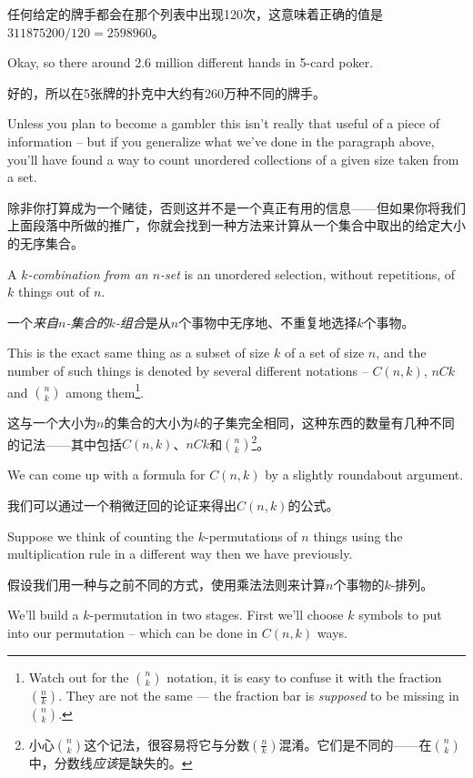 任何给定的牌手都会在那个列表中出现120次，这意味着正确的值是$311875200/120 = 2598960$。

Okay, so there around 2.6 million
different hands in 5-card poker.

好的，所以在5张牌的扑克中大约有260万种不同的牌手。

Unless you plan to become a gambler
this isn't really that useful of a piece of information -- but if you
generalize what we've done in the paragraph above, you'll have found
a way to count unordered collections of a given size taken from a set.

除非你打算成为一个赌徒，否则这并不是一个真正有用的信息——但如果你将我们上面段落中所做的推广，你就会找到一种方法来计算从一个集合中取出的给定大小的无序集合。

A  \emph{$k$-combination from an $n$-set} is an 
unordered selection, without repetitions, of $k$ things out of $n$.

一个\emph{来自$n$-集合的$k$-组合}是从$n$个事物中无序地、不重复地选择$k$个事物。

This is the exact same thing as a subset of size $k$ of a set of size 
$n$, and the number of such things is denoted by several different 
notations -- $C(n,k)$, $nCk$ and $\displaystyle\binom{n}{k}$ among 
them\footnote{Watch out for the $\binom{n}{k}$ notation, it is easy 
to confuse it with the fraction $\left(\frac{n}{k}\right)$. They
are not the same --- the fraction bar is \emph{supposed} to be missing
in $\binom{n}{k}$.}.

这与一个大小为$n$的集合的大小为$k$的子集完全相同，这种东西的数量有几种不同的记法——其中包括$C(n,k)$、$nCk$和$\displaystyle\binom{n}{k}$\footnote{小心$\binom{n}{k}$这个记法，很容易将它与分数$\left(\frac{n}{k}\right)$混淆。它们是不同的——在$\binom{n}{k}$中，分数线\emph{应该}是缺失的。}。

We can come
up with a formula for $C(n,k)$ by a slightly roundabout argument.

我们可以通过一个稍微迂回的论证来得出$C(n,k)$的公式。

Suppose we think of counting the $k$-permutations of $n$ things using the
multiplication rule in a different way then we have previously.

假设我们用一种与之前不同的方式，使用乘法法则来计算$n$个事物的$k$-排列。

We'll
build a $k$-permutation in two stages.  First we'll choose $k$ symbols
to put into our permutation -- which can be done in $C(n,k)$ ways.

